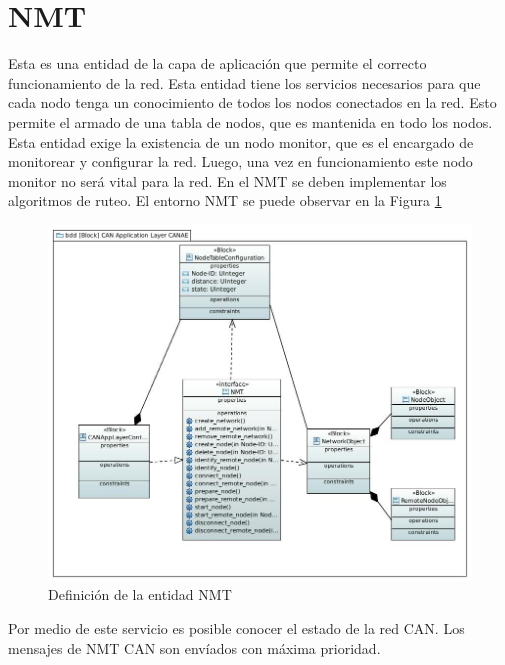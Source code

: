 \section{NMT}\label{Appendix:A}
Esta es una entidad de la capa de aplicación que permite el correcto
funcionamiento de la red. Esta entidad tiene los servicios necesarios para que
cada nodo tenga un conocimiento de todos los nodos conectados en la red. Esto
permite el armado de una tabla de nodos, que es mantenida en todo los
nodos. Esta entidad exige la existencia de un nodo monitor, que es el encargado
de monitorear y configurar la red. Luego, una vez en funcionamiento este nodo
monitor no será vital para la red. En el NMT se deben implementar los
algoritmos de ruteo. El entorno NMT se puede observar en la Figura \ref{fig:NMT}

\begin{figure}[h!]
 \centering
 \includegraphics[scale=0.4]{images/Secciones/AppendixA/NMT.JPG}
  \caption{Definición de la entidad NMT}
\label{fig:NMT}
\end{figure} 

Por medio de este servicio es posible conocer el estado de la red CAN. Los
mensajes de NMT CAN son envíados con máxima prioridad. 
